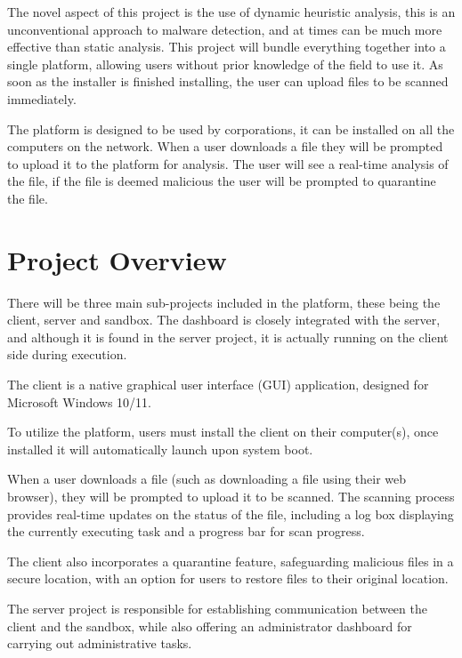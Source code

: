 The novel aspect of this project is the use of dynamic heuristic analysis,
this is an unconventional approach to malware detection,
and at times can be much more effective than static analysis.
This project will bundle everything together into a single platform,
allowing users without prior knowledge of the field to use it.
As soon as the installer is finished installing,
the user can upload files to be scanned immediately.

The platform is designed to be used by corporations,
it can be installed on all the computers on the network.
When a user downloads a file they will be prompted to upload it to the platform for analysis.
The user will see a real-time analysis of the file,
if the file is deemed malicious the user will be prompted to quarantine the file.




\section{Project Overview}
There will be three main sub-projects included in the platform,
these being the client, server and sandbox.
The dashboard is closely integrated with the server,
and although it is found in the server project,
it is actually running on the client side during execution.

The client is a native graphical user interface (GUI) application,
designed for Microsoft Windows 10/11.

To utilize the platform, users must install the client on their computer(s),
once installed it will automatically launch upon system boot.

When a user downloads a file (such as downloading a file using their web browser),
they will be prompted to upload it to be scanned.
The scanning process provides real-time updates on the status of the file,
including a log box displaying the currently executing task and a progress bar for scan progress.

The client also incorporates a quarantine feature, safeguarding malicious files in a secure location,
with an option for users to restore files to their original location.

The server project is responsible for establishing communication between the client and the sandbox,
while also offering an administrator dashboard for carrying out administrative tasks.

